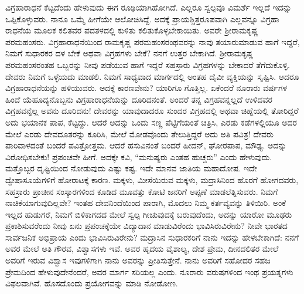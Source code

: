 ವಿಗ್ರಹಾರಾಧನೆ ಕೆಟ್ಟದೆಂದು ಹೇಳುವುದು ಈಗ ರೂಢಿಯಾಗಿಹೋಗಿದೆ. ಎಲ್ಲರೂ ಸ್ವಲ್ಪವೂ ವಿಮರ್ಶೆ ಇಲ್ಲದೆ ಇದನ್ನು ಒಪ್ಪಿಕೊಳ್ಳುವರು. ನಾನೂ ಒಮ್ಮೆ ಹೀಗೆಯೇ ಆಲೋಚಿಸಿದ್ದೆ. ಅದಕ್ಕೆ ಪ್ರಾಯಶ್ಚಿತ್ತರೂಪವಾಗಿ ಎಲ್ಲವನ್ನೂ ವಿಗ್ರಹಾ ರಾಧನೆಯ ಮೂಲಕ ಕಲಿತವರ ಪದತಳದಲ್ಲಿ ಕುಳಿತು ಕಲಿತುಕೊಳ್ಳಬೇಕಾಯಿತು. ಅವರೇ ಶ‍್ರೀರಾಮಕೃಷ್ಣ ಪರಮಹಂಸರು. ವಿಗ್ರಹಾರಾಧನೆಯಿಂದ ರಾಮಕೃಷ್ಣ ಪರಮಹಂಸರಂಥವರನ್ನು ನಾವು ತಯಾರುಮಾಡುವ ಹಾಗೆ ಇದ್ದರೆ, ನಿಮಗೆ ಸುಧಾರಕರ ದಳ ಬೇಕೆ ಅಥವಾ ವಿಗ್ರಹಗಳು ಬೇಕೆ? ನನಗೆ ಉತ್ತರ ಬೇಕಾಗಿದೆ. ಶ‍್ರೀರಾಮಕೃಷ್ಣ ಪರಮಹಂಸರಂತಹ ಒಬ್ಬರನ್ನು ನೀವು ಪಡೆಯುವ ಹಾಗೆ ಇದ್ದರೆ ಸಹಸ್ರಾರು ವಿಗ್ರಹಗಳನ್ನು ಬೇಕಾದರೆ ತೆಗೆದುಕೊಳ್ಳಿ. ದೇವರು ನಿಮಗೆ ಒಳ್ಳೆಯದು ಮಾಡಲಿ. ನಿಮಗೆ ಸಾಧ್ಯವಾದ ಮಾರ್ಗದಲ್ಲಿ ಅಂತಹ ದೈವೀ ವ್ಯಕ್ತಿಯನ್ನು ಸೃಷ್ಟಿಸಿ. ಆದರೂ ವಿಗ್ರಹಾರಾಧನೆಯನ್ನು ಹಳಿಯುವರು. ಅದಕ್ಕೆ ಕಾರಣವೇನು? ಯಾರಿಗೂ ಗೊತ್ತಿಲ್ಲ. ಏಕೆಂದರೆ ನೂರಾರು ವರ್ಷಗಳ ಹಿಂದೆ ಯೆಹೂದ್ಯನೊಬ್ಬನು ವಿಗ್ರಹಾರಾಧನೆಯನ್ನು ದೂರಿದನಂತೆ. ಅಂದರೆ ತನ್ನ ವಿಗ್ರಹವನ್ನಲ್ಲದೆ ಉಳಿದವರ ವಿಗ್ರಹವನ್ನೆಲ್ಲ ಅವನು ದೂರಿದನು! ದೇವರನ್ನು ಯಾವುದಾದರೂ ಸುಂದರ ವಿಗ್ರಹದಲ್ಲಿ ಅಥವಾ ಚಿಹ್ನೆಯಲ್ಲಿ ತೋರಿದ್ದರೆ ಅದು ಭಯಾನಕ ಪಾಪ, ಕೆಟ್ಟದ್ದು. ಆದರೆ ಅದನ್ನು ಒಂದು ಸಣ್ಣ ಪೆಟ್ಟಿಗೆಯಂತೆ ಚಿತ್ರಿಸಿ, ಎರಡು ಕಡೆಗಳಲ್ಲಿಯೂ ಅದರ ಮೇಲೆ ಎರಡು ದೇವದೂತರನ್ನು ಕೂರಿಸಿ, ಮೇಲೆ ಮೋಡವೊಂದು ತೇಲುತ್ತಿದ್ದರೆ ಅದು ಅತಿ ಪವಿತ್ರ! ದೇವರು ಪಾರಿವಾಳದಂತೆ ಬಂದರೆ ಪವಿತ್ರೋತ್ತಮ. ಆದರೆ ಹಸುವಿನಂತೆ ಬಂದರೆ ಹೀದನ್​, ಘೋರಪಾಪ, ಮೌಢ್ಯ. ಅದನ್ನು ವಿರೋಧಿಸಬೇಕು! ಪ್ರಪಂಚವೇ ಹೀಗೆ. ಅದಕ್ಕೇ ಕವಿ, “ಮನುಷ್ಯರು ಎಂತಹ ಹುಚ್ಚರು” ಎಂದು ಹೇಳುವುದು. ಮತ್ತೊಬ್ಬರ ದೃಷ್ಟಿಯಿಂದ ನೋಡುವುದು ಎಷ್ಟು ಕಷ್ಟ. ಇದೇ ಮಾನವ ಜಾತಿಯ ಮಹಾದೋಷ. ಇದೇ ದ್ವೇಷಾಸೂಯೆಗಳಿಗೆ ಹೋರಾಟಕ್ಕೆ ಕಾರಣ. ಮಕ್ಕಳು, ಮೀಸೆಯಿರುವ ಮಕ್ಕಳು, ಮದ್ರಾಸಿನಿಂದ ಹೊರಗೆ ಹೋಗದವರು, ಸಹಸ್ರಾರು ಪ್ರಾಚೀನ ಸಂಸ್ಕಾರಗಳಿಂದ ಕೂಡಿದ ಮೂವತ್ತು ಕೋಟಿ ಜನರಿಗೆ ಅಪ್ಪಣೆ ಮಾಡಲೆತ್ನಿಸುವರು. ನಿಮಗೆ ನಾಚಿಕೆಯಾಗುವುದಿಲ್ಲವೇ? ಇಂತಹ ದೇವನಿಂದೆಯಿಂದ ಪಾರಾಗಿ, ಮೊದಲು ನಿಮ್ಮ ಕರ್ತವ್ಯವನ್ನು ತಿಳಿಯಿರಿ. ಅಂಕೆ ಇಲ್ಲದ ಹುಡುಗರೆ, ನಿಮಗೆ ಬಿಳಿಕಾಗದದ ಮೇಲೆ ಸ್ವಲ್ಪ ಗೀಚುವುದಕ್ಕೆ ಬರುವುದೆಂದು, ಅದನ್ನು ಯಾರೋ ಮೂಢರು ಪ್ರಕಾಶಿಸುವರೆಂದು ನೀವು ಏನು ಪ್ರಪಂಚಕ್ಕೆಯೇ ವಿದ್ಯಾದಾನ ಮಾಡುವಿರೆಂದು ಭಾವಿಸಿರುವಿರೇನು? ನೀವೇ ಭಾರತದ ಸಾರ್ವಜನಿಕ ಅಭಿಪ್ರಾಯ ಎಂದು ಭಾವಿಸಿರುವಿರೇನು? ಮದ್ರಾಸಿನ ಸುಧಾರಕರಿಗೆ ನಾನು ಇದನ್ನು ಹೇಳಬೇಕಾಗಿದೆ: ನನಗೆ ಅವರ ಮೇಲೆ ಅತಿ ಗೌರವ, ವಿಶ್ವಾಸಗಳು ಇವೆ. ಅವರ ಹೃದಯ ವೈಶಾಲ್ಯ, ದೇಶ ಪ್ರೇಮ, ದೀನದಲಿತರ ಮೇಲೆ ಅವರಿಗೆ ಇರುವ ವಿಶ್ವಾಸ ಇವುಗಳಿಗಾಗಿ ನಾನು ಅವರನ್ನು ಪ್ರೀತಿಸುತ್ತೇನೆ. ನಾನು ಅವರಿಗೆ ಸಹೋದರ ಸಹಜ ಪ್ರೇಮದಿಂದ ಹೇಳುವುದೇನೆಂದರೆ, ಅವರ ಮಾರ್ಗ ಸರಿಯಲ್ಲ ಎಂದು. ನೂರಾರು ವರುಷಗಳಿಂದ ಇಂಥ ಪ್ರಯತ್ನಗಳು ವಿಫಲವಾಗಿವೆ. ಹೊಸದೊಂದು ಪ್ರಯೋಗವನ್ನು ಮಾಡಿ ನೋಡೋಣ.

